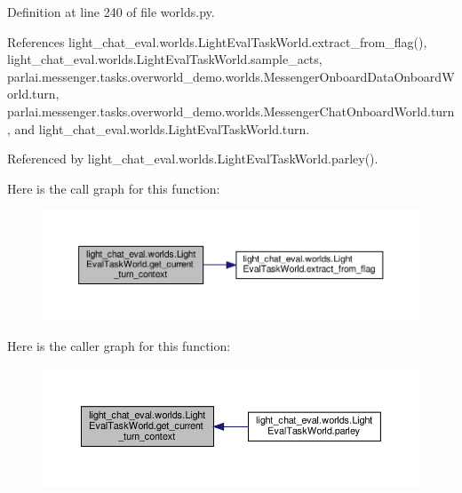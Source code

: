 Definition at line 240 of file worlds.\+py.



References light\+\_\+chat\+\_\+eval.\+worlds.\+Light\+Eval\+Task\+World.\+extract\+\_\+from\+\_\+flag(), light\+\_\+chat\+\_\+eval.\+worlds.\+Light\+Eval\+Task\+World.\+sample\+\_\+acts, parlai.\+messenger.\+tasks.\+overworld\+\_\+demo.\+worlds.\+Messenger\+Onboard\+Data\+Onboard\+World.\+turn, parlai.\+messenger.\+tasks.\+overworld\+\_\+demo.\+worlds.\+Messenger\+Chat\+Onboard\+World.\+turn, and light\+\_\+chat\+\_\+eval.\+worlds.\+Light\+Eval\+Task\+World.\+turn.



Referenced by light\+\_\+chat\+\_\+eval.\+worlds.\+Light\+Eval\+Task\+World.\+parley().

Here is the call graph for this function\+:
\nopagebreak
\begin{figure}[H]
\begin{center}
\leavevmode
\includegraphics[width=350pt]{classlight__chat__eval_1_1worlds_1_1LightEvalTaskWorld_a55840132c24a5cd4147123774ed4dd55_cgraph}
\end{center}
\end{figure}
Here is the caller graph for this function\+:
\nopagebreak
\begin{figure}[H]
\begin{center}
\leavevmode
\includegraphics[width=350pt]{classlight__chat__eval_1_1worlds_1_1LightEvalTaskWorld_a55840132c24a5cd4147123774ed4dd55_icgraph}
\end{center}
\end{figure}
\mbox{\label{classlight__chat__eval_1_1worlds_1_1LightEvalTaskWorld_ad7b6b353e331f0e4eb6a0bc9198a58ee}} 
